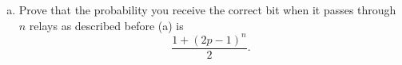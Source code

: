 \documentclass[11pt,letterpaper]{report}
\begin{document}
\begin{enumerate}
\begin{enumerate}[(a)]
		\item Prove that the probability you receive the correct bit when it passes through $n$ relays as described before (a) is
		\[
		\frac{1+(2p-1)^n}{2}.
		\]
	\end{enumerate}




\end{enumerate}
\end{document}
